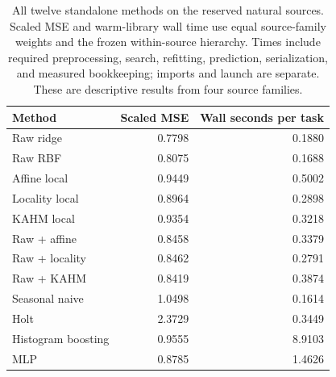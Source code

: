 \begin{table}[t]
\centering\small
\caption{All twelve standalone methods on the reserved natural sources. Scaled MSE and warm-library wall time use equal source-family weights and the frozen within-source hierarchy. Times include required preprocessing, search, refitting, prediction, serialization, and measured bookkeeping; imports and launch are separate. These are descriptive results from four source families.}
\label{tab:natural-main}
\begin{tabular}{lrr}
\toprule
Method & Scaled MSE & Wall seconds per task \\
\midrule
Raw ridge & 0.7798 & 0.1880 \\
Raw RBF & 0.8075 & 0.1688 \\
Affine local & 0.9449 & 0.5002 \\
Locality local & 0.8964 & 0.2898 \\
KAHM local & 0.9354 & 0.3218 \\
Raw + affine & 0.8458 & 0.3379 \\
Raw + locality & 0.8462 & 0.2791 \\
Raw + KAHM & 0.8419 & 0.3874 \\
Seasonal naive & 1.0498 & 0.1614 \\
Holt & 2.3729 & 0.3449 \\
Histogram boosting & 0.9555 & 8.9103 \\
MLP & 0.8785 & 1.4626 \\
\bottomrule
\end{tabular}
\end{table}
